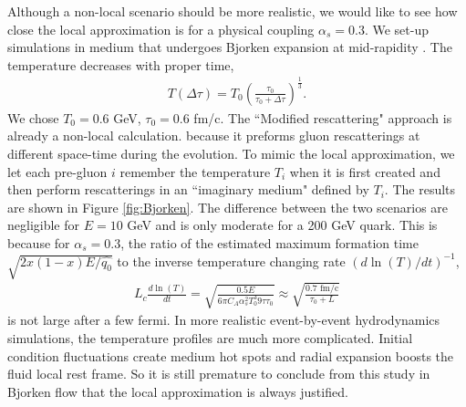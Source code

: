 \documentclass[aps, prc, reprint, amsmath, groupedaddress, nofootinbib]{revtex4-1}
\begin{document}
Although a non-local scenario should be more realistic, we would like to see how close the local approximation is for a physical coupling $\alpha_s = 0.3$.
We set-up simulations in medium that undergoes Bjorken expansion at mid-rapidity \cite{PhysRevD.27.140}. 
The temperature decreases with proper time,
\begin{eqnarray}
T(\Delta\tau) = T_0 \left(\frac{\tau_0}{\tau_0+\Delta\tau}\right)^{\frac{1}{3}}.
\end{eqnarray}
We chose $T_0=0.6$ GeV, $\tau_0=0.6$ fm/c.
The ``Modified rescattering" approach is already a non-local calculation. because it preforms gluon rescatterings at different space-time during the evolution. 
To mimic the local approximation, we let each pre-gluon $i$ remember the temperature $T_i$ when it is first created and then perform rescatterings in an ``imaginary medium" defined by $T_i$.
The results are shown in Figure \ref{fig:Bjorken}. 
The difference between the two scenarios are negligible for $E=10$ GeV and is only moderate for a 200 GeV quark.
This is because for $\alpha_s = 0.3$, the ratio of the estimated maximum formation time $\sqrt{2x(1-x)E/\hat{q_0}}$ to the inverse temperature changing rate $(d\ln(T)/dt)^{-1}$,
\begin{eqnarray}
L_c \frac{d\ln(T)}{dt} = \sqrt{\frac{0.5 E}{6\pi C_A\alpha_s^2 T_0^3 9\tau\tau_0}} \approx \sqrt{\frac{0.7 \textrm{ fm/c}}{\tau_0+L}}
\end{eqnarray}
is not large after a few fermi. 
In more realistic event-by-event hydrodynamics simulations, the temperature profiles are much more complicated.
Initial condition fluctuations create medium hot spots and radial expansion boosts the fluid local  rest frame.
So it is still premature to conclude from this study in Bjorken flow that the local approximation is always justified.
\end{document}
